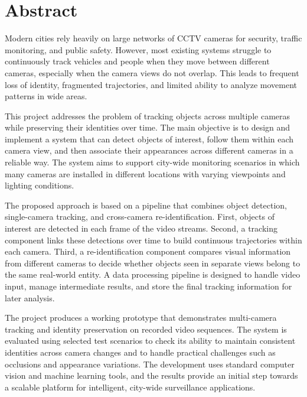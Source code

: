 \chapter*{Abstract}
\setlength{\parindent}{0pt}
\setlength{\parskip}{0.8em}

Modern cities rely heavily on large networks of CCTV cameras for security, traffic monitoring, and public safety. However, most existing systems struggle to continuously track vehicles and people when they move between different cameras, especially when the camera views do not overlap. This leads to frequent loss of identity, fragmented trajectories, and limited ability to analyze movement patterns in wide areas.

This project addresses the problem of tracking objects across multiple cameras while preserving their identities over time. The main objective is to design and implement a system that can detect objects of interest, follow them within each camera view, and then associate their appearances across different cameras in a reliable way. The system aims to support city-wide monitoring scenarios in which many cameras are installed in different locations with varying viewpoints and lighting conditions.

The proposed approach is based on a pipeline that combines object detection, single-camera tracking, and cross-camera re-identification. First, objects of interest are detected in each frame of the video streams. Second, a tracking component links these detections over time to build continuous trajectories within each camera. Third, a re-identification component compares visual information from different cameras to decide whether objects seen in separate views belong to the same real-world entity. A data processing pipeline is designed to handle video input, manage intermediate results, and store the final tracking information for later analysis.

The project produces a working prototype that demonstrates multi-camera tracking and identity preservation on recorded video sequences. The system is evaluated using selected test scenarios to check its ability to maintain consistent identities across camera changes and to handle practical challenges such as occlusions and appearance variations. The development uses standard computer vision and machine learning tools, and the results provide an initial step towards a scalable platform for intelligent, city-wide surveillance applications.